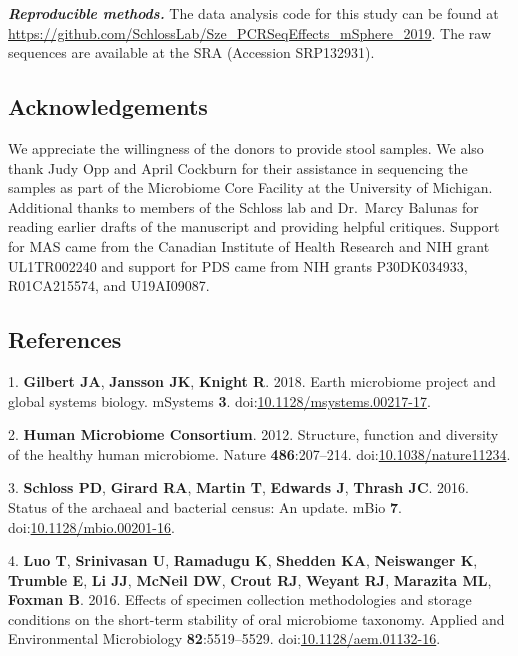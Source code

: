 \documentclass[11pt,]{article}
\begin{document}
\textbf{\emph{Reproducible methods.}} The data analysis code for this
study can be found at
\url{https://github.com/SchlossLab/Sze_PCRSeqEffects_mSphere_2019}. The
raw sequences are available at the SRA (Accession SRP132931).

\hypertarget{acknowledgements}{%
\subsection{Acknowledgements}\label{acknowledgements}}

We appreciate the willingness of the donors to provide stool samples. We
also thank Judy Opp and April Cockburn for their assistance in
sequencing the samples as part of the Microbiome Core Facility at the
University of Michigan. Additional thanks to members of the Schloss lab
and Dr.~Marcy Balunas for reading earlier drafts of the manuscript and
providing helpful critiques. Support for MAS came from the Canadian
Institute of Health Research and NIH grant UL1TR002240 and support for
PDS came from NIH grants P30DK034933, R01CA215574, and U19AI09087.

\newpage

\hypertarget{references}{%
\subsection{References}\label{references}}

\hypertarget{refs}{}
\leavevmode\hypertarget{ref-Gilbert2018}{}%
1. \textbf{Gilbert JA}, \textbf{Jansson JK}, \textbf{Knight R}. 2018.
Earth microbiome project and global systems biology. mSystems
\textbf{3}.
doi:\href{https://doi.org/10.1128/msystems.00217-17}{10.1128/msystems.00217-17}.

\leavevmode\hypertarget{ref-HMP2012}{}%
2. \textbf{Human Microbiome Consortium}. 2012. Structure, function and
diversity of the healthy human microbiome. Nature \textbf{486}:207--214.
doi:\href{https://doi.org/10.1038/nature11234}{10.1038/nature11234}.

\leavevmode\hypertarget{ref-Schloss2016}{}%
3. \textbf{Schloss PD}, \textbf{Girard RA}, \textbf{Martin T},
\textbf{Edwards J}, \textbf{Thrash JC}. 2016. Status of the archaeal and
bacterial census: An update. mBio \textbf{7}.
doi:\href{https://doi.org/10.1128/mbio.00201-16}{10.1128/mbio.00201-16}.

\leavevmode\hypertarget{ref-Luo2016}{}%
4. \textbf{Luo T}, \textbf{Srinivasan U}, \textbf{Ramadugu K},
\textbf{Shedden KA}, \textbf{Neiswanger K}, \textbf{Trumble E},
\textbf{Li JJ}, \textbf{McNeil DW}, \textbf{Crout RJ}, \textbf{Weyant
RJ}, \textbf{Marazita ML}, \textbf{Foxman B}. 2016. Effects of specimen
collection methodologies and storage conditions on the short-term
stability of oral microbiome taxonomy. Applied and Environmental
Microbiology \textbf{82}:5519--5529.
doi:\href{https://doi.org/10.1128/aem.01132-16}{10.1128/aem.01132-16}.
\end{document}
